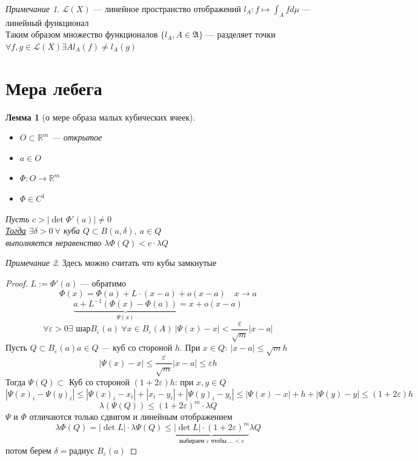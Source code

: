 \documentclass[oneside]{book}
\newcommand{\R}{\mathbb{R}}
\newcommand{\A}{\mathfrak{A}}
\theoremstyle{plain}
\newtheorem{lemma}{Лемма}
\theoremstyle{remark}
\newtheorem*{remark}{Примечание}
\theoremstyle{definition}
\begin{document}
\begin{remark}
\(\mathcal{L}(X)\) --- линейное пространство отображений \(l_A : f \mapsto \int_A f d\mu\) --- линейный функционал \\
Таким образом множество функционалов \(\{l_A, A \in \A\}\) --- разделяет точки \\
\(\forall f, g \in \mathcal{L}(X) \exists A l_A(f) \neq l_A(g)\)
\end{remark}
\section{Мера лебега}
\label{sec:org06de301}
\begin{lemma}[о мере образа малых кубических ячеек]
\-
\begin{itemize}
\item \(O \subset \R^m\) --- открытое
\item \(a \in O\)
\item \(\Phi: O \to \R^m\)
\item \(\Phi \in C^1\)
\end{itemize}
Пусть \(c > |\det\Phi'(a)| \neq 0\) \\
\uline{Тогда} \(\exists \delta > 0\ \forall\) куба \(Q \subset B(a, \delta),\ a\in Q\) \\
выполняется неравенство \(\lambda \Phi(Q) < c \cdot \lambda Q\)
\end{lemma}
\begin{remark}
Здесь можно считать что кубы замкнутые
\end{remark}
\begin{proof}
\(L := \Phi'(a)\) --- обратимо \\
\[ \Phi(x) = \Phi(a) + L\cdot(x - a) + o(x - a)\quad x \to a \]
\[ \underbrace{a + L^{-1}(\Phi(x) - \Phi(a))}_{\Psi(x)} = x + o(x - a) \]
\[ \forall \varepsilon > 0 \exists \text{ шар} B_\varepsilon(a)\ \forall x \in B_\varepsilon(A)\ |\Psi(x) - x| < \frac{\varepsilon}{\sqrt{m}} |x - a| \]
Пусть \(Q \subset B_\varepsilon(a) a \in Q\) --- куб со стороной \(h\). При \(x \in Q:\ |x - a| \le \sqrt{m}h\)
\[ |\Psi(x) - x| \le \frac{\varepsilon}{\sqrt{m}}|x - a| \le \varepsilon h \]
Тогда \(\Psi(Q) \subset\) Куб со стороной \((1 + 2\varepsilon)h\): при \(x, y \in Q\)
\[ |\Psi(x)_i - \Psi(y)_i| \le |\Psi(x)_i - x_i| + |x_i - y_i| + |\Psi(y)_i - y_i| \le |\Psi(x) - x| + h + |\Psi(y) - y| \le (1 + 2\varepsilon)h\]
\[ \lambda(\Psi(Q)) \le (1 + 2\varepsilon)^m \cdot \lambda Q  \]
\(\Psi\) и \(\Phi\) отличаются только сдвигом и линейным отображением
\[ \lambda \Phi(Q) = |\det L| \cdot \lambda \Psi(Q) \le \underbrace{|\det L|\cdot(1 + 2\varepsilon)^m}_{\text{выбираем }\varepsilon\text{ чтобы } ... < c } \lambda Q \]
потом берем \(\delta = \text{радиус } B_\varepsilon(a)\)
\end{proof}
\end{document}
